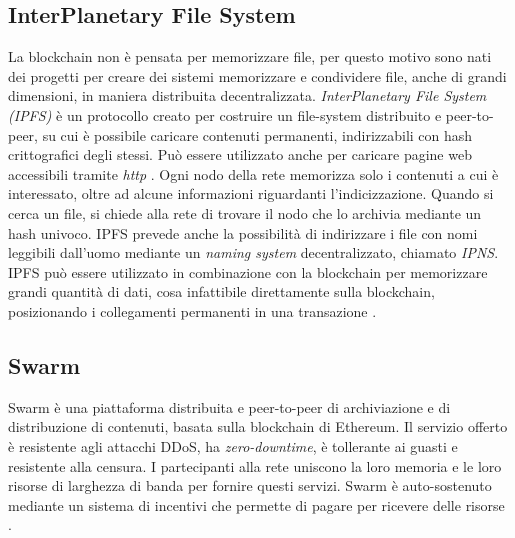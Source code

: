 \subsection{InterPlanetary File System}
La blockchain non è pensata per memorizzare file, per questo motivo sono nati dei progetti per creare dei sistemi memorizzare e condividere file, anche di grandi dimensioni, in maniera distribuita decentralizzata.
\emph{InterPlanetary File System (IPFS)} è un protocollo creato per costruire un file-system distribuito e peer-to-peer, su cui è possibile caricare contenuti permanenti, indirizzabili con hash crittografici degli stessi. Può essere utilizzato anche per caricare pagine web accessibili tramite \emph{http} \cite{ipfs}. Ogni nodo della rete memorizza solo i contenuti a cui è interessato, oltre ad alcune informazioni riguardanti l'indicizzazione. Quando si cerca un file, si chiede alla rete di trovare il nodo che lo archivia mediante un hash univoco. IPFS prevede anche la possibilità di indirizzare i file con nomi leggibili dall'uomo mediante un \emph{naming system} decentralizzato, chiamato \emph{IPNS}. IPFS può essere utilizzato in combinazione con la blockchain per memorizzare grandi quantità di dati, cosa infattibile direttamente sulla blockchain, posizionando i collegamenti permanenti in una transazione \cite{ipfs-io}.

\subsection{Swarm}
Swarm è una piattaforma distribuita e peer-to-peer di archiviazione e di distribuzione di contenuti, basata sulla blockchain di Ethereum. Il servizio offerto è resistente agli attacchi DDoS, ha \emph{zero-downtime}, è tollerante ai guasti e resistente alla censura. I partecipanti alla rete uniscono la loro memoria e le loro risorse di larghezza di banda per fornire questi servizi. Swarm è auto-sostenuto mediante un sistema di incentivi che permette di pagare per ricevere delle risorse \cite{swarm}.

\newpage
